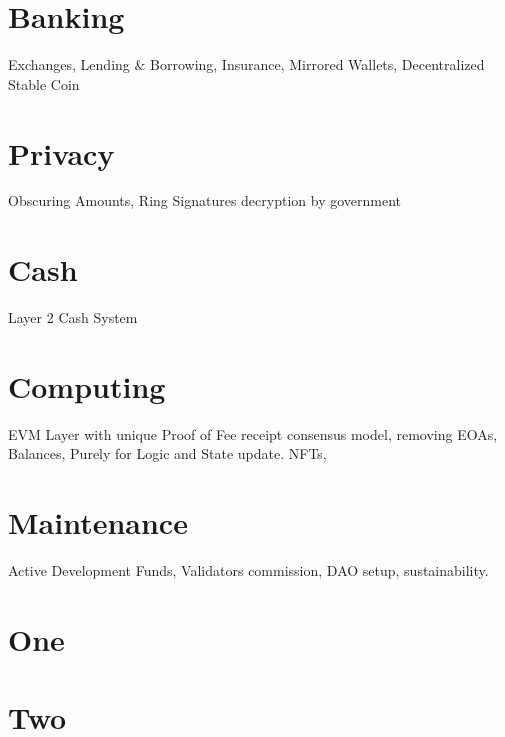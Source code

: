 \documentclass[a4paper,10pt]{article}
\begin{document}
\section{Banking}
Exchanges, Lending \& Borrowing, Insurance, Mirrored Wallets, Decentralized Stable Coin

\section{Privacy}
Obscuring Amounts, Ring Signatures decryption by government

\section{Cash}
Layer 2 Cash System 

\section{Computing}
EVM Layer with unique Proof of Fee receipt consensus model, removing EOAs, Balances, Purely for Logic and State update. NFTs, 

\section{Maintenance}
Active Development Funds, Validators commission, DAO setup, sustainability.


\appendix

\section{One}

\section{Two}
\end{document}
